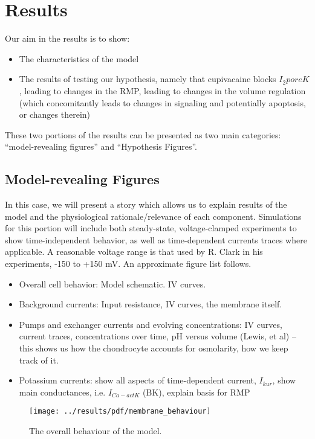 \section{Results}
\label{results}

Our aim in the results is to show:
\begin{itemize}
\item The characteristics of the model
\item The results of testing our hypothesis, namely that cupivacaine
  blocks $I_2poreK$, leading to changes in the RMP, leading to changes
  in the volume regulation (which concomitantly leads to changes in
  signaling and potentially apoptosis, or changes therein)
\end{itemize}

These two portions of the results can be presented as two main
categories: ``model-revealing figures'' and ``Hypothesis Figures''.

\subsection{Model-revealing Figures}
In this case, we will present a story which allows us to explain
results of the model and the physiological rationale/relevance of each
component. Simulations for this portion will include both
steady-state, voltage-clamped experiments to show time-independent
behavior, as well as time-dependent currents traces where
applicable. A reasonable voltage range is that used by R. Clark in his
experiments, -150 to +150 mV. An approximate figure list follows.

\begin{itemize}
\item Overall cell behavior: Model schematic. IV curves.
\item Background currents: Input resistance, IV curves, the membrane itself.
\item Pumps and exchanger currents and evolving concentrations: IV
  curves, current traces, concentrations over time, pH versus volume
  (Lewis, et al) -- this shows us how the chondrocyte accounts for
  osmolarity, how we keep track of it.
\item Potassium currents: show all aspects of time-dependent current,
  $I_{kur}$, show main conductances, i.e. $I_{Ca-act K}$ (BK), explain
  basis for RMP
\end{itemize}

\begin{figure}
  \centering
  \texttt{[image: ../results/pdf/membrane\_behaviour]}
  \caption{The overall behaviour of the model.}
  \label{fig:overall-behaviour}
\end{figure}


